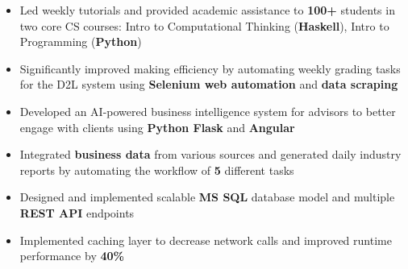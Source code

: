 \documentclass[10pt,a4paper]{altacv}
\begin{document}
 \begin{itemize} 
 \item Led weekly tutorials and provided academic assistance to \textbf{100+} students in two core CS courses: Intro to Computational Thinking (\textbf{Haskell}), Intro to Programming (\textbf{Python})
 \item Significantly improved making efficiency by automating weekly grading tasks for the D2L system using 
\textbf{Selenium web automation} and \textbf{data scraping}
 
 
 \end{itemize}
\divider

\begin{itemize}
  \item Developed an AI-powered business intelligence system for advisors to better engage with clients using \textbf{Python Flask} and \textbf{Angular}
  \item Integrated \textbf{business data} from various sources and generated daily industry reports by automating the workflow of \textbf{5} different tasks
  \item Designed and implemented scalable \textbf{MS SQL} database model and multiple \textbf{REST API }endpoints
  \item Implemented caching layer to decrease network calls and improved runtime performance by \textbf{40\%}

 \end{itemize} 




         \\
       
\divider\smallskip
{}     
 



\divider

\divider

\end{document}
